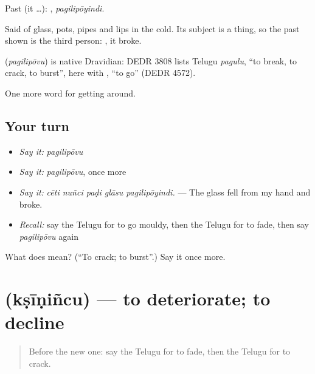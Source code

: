 Past (it …): , \emph{pagilipōyindi}.

Said of glass, pots, pipes and lips in the cold. Its subject is a thing, so the past shown is the third person: , it broke.

\begin{cousinweb}
\textbf{} (\emph{pagilipōvu}) is native Dravidian: DEDR 3808 lists Telugu \emph{pagulu}, \textquotedblleft{}to break, to crack, to burst\textquotedblright{}, here with , \textquotedblleft{}to go\textquotedblright{} (DEDR 4572).
\end{cousinweb}

\begin{grammarlens}[title={What you've built}]
One more word for getting around.
\end{grammarlens}

\subsection*{Your turn}
\begin{itemize}
\raggedright
  \item \emph{Say it:} \emph{pagilipōvu}
  \item \emph{Say it:} \emph{pagilipōvu}, once more
  \item \emph{Say it:} \emph{cēti nuñci paḍi glāsu pagilipōyindi.} — The glass fell from my hand and broke.
  \item \emph{Recall:} say the Telugu for to go mouldy, then the Telugu for to fade, then say \emph{pagilipōvu} again
\end{itemize}

\begin{tcolorbox}[breakable,colback=teal!4,colframe=teal!35!black,title={Before you move on}]
What does  mean? (\textquotedblleft{}To crack; to burst\textquotedblright{}.) Say it once more.
\end{tcolorbox}
\section[\texorpdfstring{\te{క్షీణించు} (kṣīṇiñcu)}{క్షీణించు (kṣīṇiñcu)}]{ (kṣīṇiñcu) — to deteriorate; to decline}

\label{lesson:TE-C491-ksinincu}



\begin{quote}
Before the new one: say the Telugu for to fade, then the Telugu for to crack.
\end{quote}

